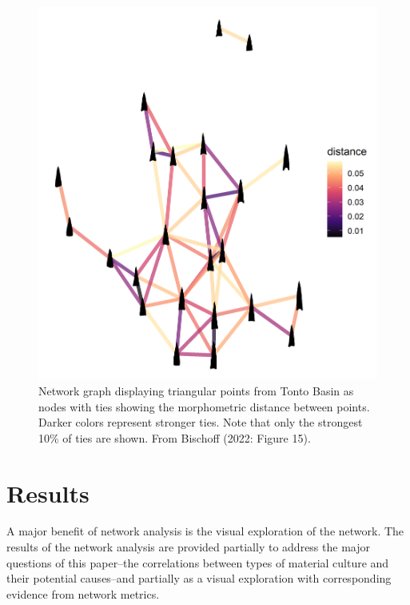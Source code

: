\documentclass[]{interact}
\theoremstyle{plain}%
\theoremstyle{definition}
\theoremstyle{remark}
\begin{document}
\begin{figure}
\includegraphics[width=1\linewidth]{figures/TontoTriangularDistanceNetwork} \caption{Network graph displaying triangular points from Tonto Basin as nodes with ties showing the morphometric distance between points. Darker colors represent stronger ties. Note that only the strongest 10\% of ties are shown. From Bischoff (2022: Figure 15).}\label{fig:TontoTriangularDistanceNetwork}
\end{figure}

\hypertarget{results}{%
\section*{Results}\label{results}}

A major benefit of network analysis is the visual exploration of the
network. The results of the network analysis are provided partially to
address the major questions of this paper--the correlations between
types of material culture and their potential causes--and partially as a
visual exploration with corresponding evidence from network metrics.
\end{document}
